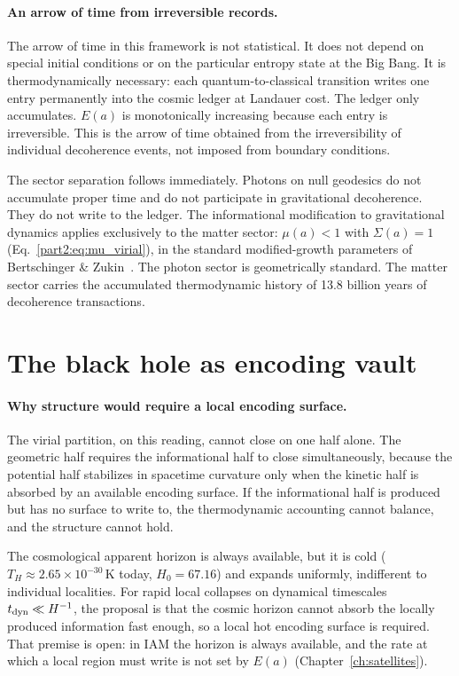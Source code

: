 \paragraph{An arrow of time from irreversible records.} The arrow of time in this framework is not statistical. It does not depend on special initial
conditions or on the particular entropy state at the Big Bang. It is thermodynamically necessary: each quantum-to-classical transition writes one entry
permanently into the cosmic ledger at Landauer cost. The ledger only accumulates. $E(a)$ is monotonically increasing because each entry is irreversible.
This is the arrow of time obtained from the irreversibility of individual decoherence events, not imposed from boundary conditions. \interp

The sector separation follows immediately. Photons on null geodesics do not accumulate proper time and do not participate in gravitational decoherence.
They do not write to the ledger. The informational modification to gravitational dynamics applies exclusively to the matter sector: $\mu(a)<1$ with
$\Sigma(a)=1$ (Eq.~\eqref{part2:eq:mu_virial}), in the standard modified-growth parameters of Bertschinger \& Zukin~\cite{BertschingerZukin2008}. The photon
sector is geometrically standard. The matter sector carries the accumulated thermodynamic history of 13.8 billion years of decoherence transactions. \derived

\section{The black hole as encoding vault}\label{sec:vd_vault}
\paragraph{Why structure would require a local encoding surface.} The virial partition, on this reading, cannot close on one half alone. The geometric half
requires the informational half to close simultaneously, because the potential half stabilizes in spacetime curvature only when the kinetic half is absorbed
by an available encoding surface. If the informational half is produced but has no surface to write to, the thermodynamic accounting cannot balance, and the
structure cannot hold. \conjecture

The cosmological apparent horizon is always available, but it is cold ($T_H\approx2.65\times10^{-30}$\,K today, $H_0=67.16$) and expands uniformly, indifferent to
individual localities. For rapid local collapses on dynamical timescales $t_{\rm dyn}\ll H^{-1}$, the proposal is that the cosmic horizon cannot absorb the
locally produced information fast enough, so a local hot encoding surface is required. That premise is open: in IAM the horizon is always available, and the rate at which a local region must write is not set by $E(a)$ (Chapter~\ref{ch:satellites}). \openprob

